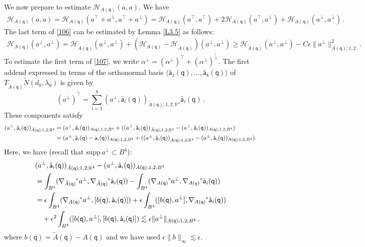 \documentclass[11pt]{article}
\numberwithin{equation}{section} \setlength{\topmargin}{-35pt}
\newcommand{\R}{\mathbb{R}}
\newcommand{\q}{\mathsf{q}}
\newcommand{\A}{\mathsf{a}}
\newcommand{\ttilde}{\tilde{\intercal}}
\newcommand{\tperp}{\tilde{\perp}}
\begin{document}
We now prepare to estimate $\mathcal{H}_{A(\q)}(a,a)$. We have
\begin{align}
\label{106}
\mathcal{H}_{A(\q)}(a,a)=\mathcal{H}_{A(\q)}(a^{\intercal}+a^{\perp},a^{\intercal}+a^{\perp})=
\mathcal{H}_{A(\q)}(a^{\intercal},a^{\intercal})+2\mathcal{H}_{A(\q)}(a^{\intercal},a^{\perp})+
\mathcal{H}_{A(\q)}(a^{\perp},a^{\perp})\,.
\end{align}
The last term of \eqref{106} can be estimated by Lemma \ref{L3.5} as
follows:
\begin{align}
\label{107} \mathcal{H}_{A(\q)}(a^{\perp},a^{\perp})
=\mathcal{H}_{\tilde{A}(\q)}(a^{\perp},a^{\perp})+(\mathcal{H}_{A(\q)}-
\mathcal{H}_{\tilde{A}(\q)})(a^{\perp},a^{\perp})
\ge\mathcal{H}_{\tilde{A}(\q)}(a^{\perp},a^{\perp})-C\epsilon\|a^{\perp}\|^2_{A(\q);1,2}\,.
\end{align}
To estimate the first term of \eqref{107}, we write
$\alpha^{\perp}=(\alpha^{\perp})^{\ttilde}+(\alpha^{\perp})^{\tperp}$.
The first addend expressed in terms of the orthonormal basis
$\langle \hat{\A}_1(\q),\ldots,\hat{\A}_8(\q)\rangle$ of
$T_{\tilde{A}(\q)}\tilde{N}(d_0,\lambda_0)$ is given by
$$(a^{\perp})^{\ttilde}=\sum_{i=1}^8(a^{\perp},\hat{\A}_i(\q))_{\tilde{A}(\q);1,2;\R^4}\hat{\A}_i(\q)\,.$$
These components satisfy
\begin{align}
\label{108}
(a^{\perp},\hat{\A}_i(\q))_{\tilde{A}(\q);1,2;\R^4}&=(a^{\perp},\hat{\A}_i(\q))_{A(\q);1,2;B^4}+
((a^{\perp},\hat{\A}_i(\q))_{\tilde{A}(\q);1,2;\R^4}-(a^{\perp},\hat{\A}_i(\q))_{A(\q);1,2;B^4})\notag\\
&=(a^{\perp},\hat{\A}_i(\q)-\A_i(\q))_{A(\q);1,2;B^4}+((a^{\perp},\hat{\A}_i(\q))_{\tilde{A}(\q);1,2;\R^4}-
(a^{\perp},\hat{\A}_i(\q))_{A(\q);1,2;B^4}).
\end{align}
Here, we have (recall that $\text{supp}\,a^{\perp}\subset B^4$):
\begin{align}
\label{109}
&(a^{\perp},\hat{\A}_i(\q))_{\tilde{A}(\q);1,2;\R^4}-(a^{\perp},\hat{\A}_i(\q))_{A(\q);1,2;B^4}\notag\\
&=\int_{B^4}({\nabla_{\tilde{A}(\q)}}^{\epsilon}a^{\perp},{\nabla_{\tilde{A}(\q)}}^{\epsilon}\hat{\A}_i(\q)) -\int_{B^4}({\nabla_{A(\q)}}^{\epsilon}a^{\perp},{\nabla_{A(q)}}^{\epsilon}\hat{\A}_i(\q)) \notag\\
&=\epsilon\int_{B^4}({\nabla_{A(\q)}}^{\epsilon}a^{\perp},[b(\q),\hat{\A}_i(\q)]) +\epsilon\int_{B^4}([b(\q),a^{\perp}],{\nabla_{A(\q)}}^{\epsilon}\hat{\A}_i(\q)) \notag\\
&\quad+\epsilon^2\int_{B^4}([b(\q),a^{\perp}],[b(\q),\hat{\A}_i(\q)])
\lesssim\epsilon\|a^{\perp}\|_{A(\q);1,2;B^4}\,,
\end{align}
where $b(\q)=\tilde{A}(\q)-A(\q)$ and we have used
$\epsilon\|b\|_{\infty}\lesssim\epsilon$.
\end{document}
